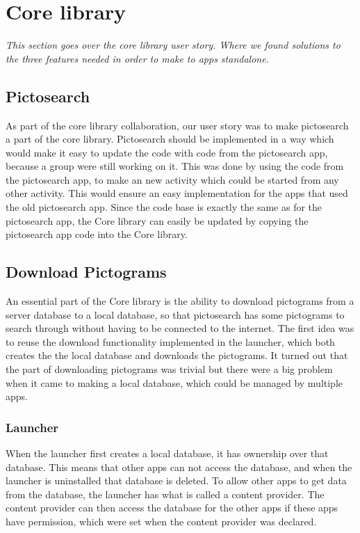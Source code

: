 \section{Core library} \label{Sprint3_SecCoreLibrary}

\textit{This section goes over the core library user story. Where we found solutions to the three features needed in order to make to apps standalone.}

\subsection{Pictosearch}
As part of the core library collaboration, our user story was to make pictosearch a part of the core library. Pictosearch should be implemented in a way which would make it easy to update the code with code from the pictosearch app, because a group were still working on it. This was done by using the code from the pictosearch app, to make an new activity which could be started from any other activity. This would ensure an easy implementation for the apps that used the old pictosearch app. Since the code base is exactly the same as for the pictosearch app, the Core library can easily be updated by copying the pictosearch app code into the Core library.

\subsection{Download Pictograms}
An essential part of the Core library is the ability to download pictograms from a server database to a local database, so that pictosearch has some pictograms to search through without having to be connected to the internet. The first idea was to reuse the download functionality implemented in the launcher, which both creates the the local database and downloads the pictograms. It turned out that the part of downloading pictograms was trivial but there were a big problem when it came to making a local database, which could be managed by multiple apps.

\subsubsection{Launcher}
When the launcher first creates a local database, it has ownership over that database. This means that other apps can not access the database, and when the launcher is uninstalled that database is deleted. To allow other apps to get data from the database, the launcher has what is called a content provider. The content provider can then access the database for the other apps if these apps have permission, which were set when the content provider was declared.

